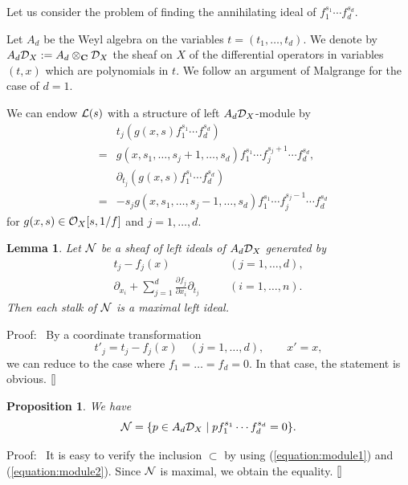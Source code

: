 \documentclass[12pt]{article}
\def\C{{\bf C}}
\def\Dsc{ {\cal D} }
\def\Lsc{ {\cal L} }
\def\Nsc{ {\cal N} }
\def\Osc{ {\cal O} }
\newenvironment{proof}{\par\noindent Proof:\ }{${\tt [}\kern-0.2mm{\tt ]}$}
\newtheorem{lemma}[theorem]{Lemma}
\newtheorem{proposition}[theorem]{Proposition}
\begin{document}
Let us consider the problem of finding the annihilating ideal
of $f_1^{s_1} \cdots f_d^{s_d}$.

Let $A_d$ be the Weyl algebra on the variables $t = (t_1,\dots,t_d)$.  
We denote by $A_d\Dsc_X := A_d \otimes_\C\Dsc_X$ 
the sheaf on $X$ of the
differential operators in variables $(t,x)$ which are polynomials in $t$.
We follow an argument of Malgrange \cite{Malgrange} for the case of $d=1$.

We can endow $\Lsc(s)$ with a structure of left $A_d\Dsc_X$-module by
\begin{eqnarray}
& & t_j(g(x,s)f_1^{s_1}\cdots f_d^{s_d})  \nonumber \\
&=& 
g(x,s_1,\dots,s_j+1,\dots,s_d)f_1^{s_1}\cdots f_j^{s_j+1}\cdots f_d^{s_d},
\label{equation:module1}
\\
& & \partial_{t_j}(g(x,s)f_1^{s_1}\cdots f_d^{s_d}) \nonumber \\
&=& -s_j
g(x,s_1,\dots,s_j-1,\dots,s_d)f_1^{s_1}\cdots f_j^{s_j-1}\cdots f_d^{s_d}
\label{equation:module2}
\end{eqnarray}
for $g(x,s) \in \Osc_X[s,1/f]$ and $j=1,\dots,d$.  

\begin{lemma}
Let $\Nsc$ be a sheaf of left ideals of $A_d\Dsc_X$ generated by
\begin{eqnarray}
t_j - f_j(x) &\quad& (j=1,\dots,d),
\label{equation:annihilator1}\\
\partial_{x_i} + \sum_{j=1}^d\frac{\partial f_j}{\partial x_i}\partial_{t_j}
&\quad& (i=1,\dots,n).
\label{equation:annihilator2}
\end{eqnarray}
Then each stalk of $\Nsc$ is a maximal left ideal.
\end{lemma}

\begin{proof}
By a coordinate transformation 
$$
t'_j = t_j - f_j(x) \quad (j = 1,\dots,d),\qquad
x' = x,
$$
we can reduce to the case where $f_1 = \dots = f_d = 0$.  
In that case, the statement is obvious.
\end{proof}

\begin{proposition}
We have
$$
\Nsc = \{p \in A_d\Dsc_X \mid 
p f_1^{s_1}\cdots f_d^{s_d} = 0\}.
$$
\end{proposition}

\begin{proof}
It is easy to verify the inclusion $\subset$ by using 
(\ref{equation:module1}) and (\ref{equation:module2}).  
Since $\Nsc$ is maximal, we obtain the equality.
\end{proof}
\end{document}
